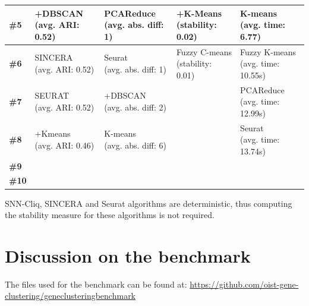 \documentclass{report}
\begin{document}
{\begin{table}[H]
\begin{tabular}{| l | l | l | l | l |}
\hline
\parbox[c]{2cm}{\textbf{\#5}} & 
\parbox[c]{3cm}{+DBSCAN\\(avg. ARI: 0.52)} & 
\parbox[c]{3cm}{PCAReduce\\(avg. abs. diff: 1)} & 
\parbox[c]{3cm}{+K-Means\\(stability: 0.02)} &
\parbox[c]{3cm}{K-means\\(avg. time: 6.77)}\\
\hline
\parbox[c]{2cm}{\textbf{\#6}} & 
\parbox[c]{3cm}{SINCERA\\(avg. ARI: 0.52)} & 
\parbox[c]{3cm}{Seurat\\(avg. abs. diff: 1)} & 
\parbox[c]{3cm}{Fuzzy C-means\\(stability: 0.01)} &
\parbox[c]{3cm}{Fuzzy K-means\\(avg. time: 10.55s)}\\
\hline
\parbox[c]{2cm}{\textbf{\#7}} & 
\parbox[c]{3cm}{SEURAT\\(avg. ARI: 0.52)} & 
\parbox[c]{3cm}{+DBSCAN\\(avg. abs. diff: 2)} & 
\parbox[c]{3cm}{} &
\parbox[c]{3cm}{PCAReduce\\(avg. time: 12.99s)}\\
\hline
\parbox[c]{2cm}{\textbf{\#8}} & 
\parbox[c]{3cm}{+Kmeans\\(avg. ARI: 0.46)} & 
\parbox[c]{3cm}{K-means\\(avg. abs. diff: 6)} & 
\parbox[c]{3cm}{} &
\parbox[c]{3cm}{Seurat\\(avg. time: 13.74s)}\\
\hline
\parbox[c]{2cm}{\textbf{\#9}} & 
\parbox[c]{3cm}{} & 
\parbox[c]{3cm}{} & 
\parbox[c]{3cm}{} &
\parbox[c]{3cm}{}\\
\hline
\parbox[c]{2cm}{\textbf{\#10}} & 
\parbox[c]{3cm}{} & 
\parbox[c]{3cm}{} & 
\parbox[c]{3cm}{} &
\parbox[c]{3cm}{}\\
\hline
\end{tabular}
\label{results}
\end{table}

SNN-Cliq, SINCERA and Seurat algorithms are deterministic, thus computing the stability measure for these algorithms is not required.

\section{Discussion on the benchmark}

The files used for the benchmark can be found at: {\url{https://github.com/oist-gene-clustering/geneclusteringbenchmark}}\\

}
\end{document}
